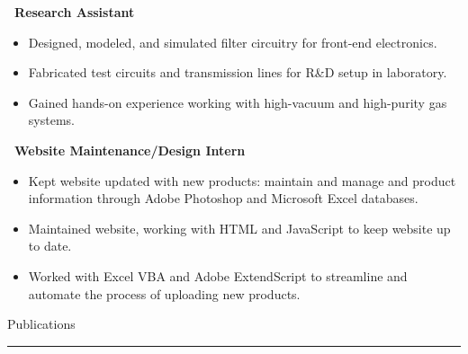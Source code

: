 \documentclass[]{article}
\begin{document}
 \newline
{\bf \ Research Assistant}
\begin{itemize}[label={$\bullet$}]
	\item Designed, modeled, and simulated filter circuitry for front-end electronics. 
	\item Fabricated test circuits and transmission lines for R\&D setup in laboratory. 
	\item Gained hands-on experience working with high-vacuum and high-purity gas systems.
\end{itemize}
	
 \newline
{\bf \ Website Maintenance/Design Intern}
\begin{itemize}[label={$\bullet$}]
	\item Kept website updated with new products: maintain and manage and product information through Adobe Photoshop and Microsoft Excel databases. 
	\item Maintained website, working with HTML and JavaScript to keep website up to date. 
	\item Worked with Excel VBA and Adobe ExtendScript to streamline and automate the process of uploading new products. 
\end{itemize}
\fi

\vspace{15pt}
{\LARGE Publications}
\vspace{3pt}
\hrule
\vspace{10pt}
\end{document}
